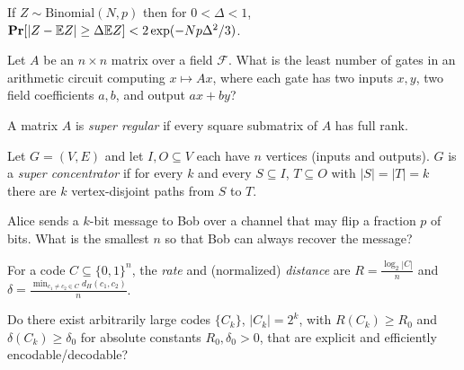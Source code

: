 \begin{lemma}
  \label{lem:chernoff}
  \mathlibok
  If $Z\sim\mathrm{Binomial}(N,p)$ then for $0<\Delta<1$,
  $\mathbf{Pr}[|Z-\mathbb{E} Z|\ge\Delta\mathbb{E} Z]<2\exp(-Np\Delta^2/3)$.
\end{lemma}


\begin{problem}
  \label{prob:linear-transform}
  Let $A$ be an $n\times n$ matrix over a field $\mathcal F$. What is the least
  number of gates in an arithmetic circuit computing $x\mapsto Ax$, where each
  gate has two inputs $x,y$, two field coefficients $a,b$, and output $ax+by$?
\end{problem}

\begin{definition}
  \label{def:super-regular}
  A matrix $A$ is \emph{super regular} if every square submatrix of $A$ has full
  rank.
\end{definition}

\begin{definition}
  \label{def:super-concentrator}
  Let $G=(V,E)$ and let $I,O\subseteq V$ each have $n$ vertices (inputs and
  outputs). $G$ is a \emph{super concentrator} if for every $k$ and every
  $S\subseteq I$, $T\subseteq O$ with $|S|=|T|=k$ there are $k$ vertex-disjoint
  paths from $S$ to $T$.
\end{definition}

\begin{problem}
  \label{prob:noisy-channel}
  Alice sends a $k$-bit message to Bob over a channel that may flip a fraction
  $p$ of bits. What is the smallest $n$ so that Bob can always recover the
  message?
\end{problem}

\begin{definition}
  \label{def:code-rate-distance}
  For a code $C\subseteq\{0,1\}^n$, the \emph{rate} and (normalized)
  \emph{distance} are $R=\frac{\log_2|C|}{n}$ and
  $\delta=\frac{\min_{c_1\neq c_2\in C}d_H(c_1,c_2)}{n}$.
\end{definition}

\begin{problem}
  \label{prob:refined-codes}
  Do there exist arbitrarily large codes $\{C_k\}$, $|C_k|=2^k$, with
  $R(C_k)\ge R_0$ and $\delta(C_k)\ge\delta_0$ for absolute constants
  $R_0,\delta_0>0$, that are explicit and efficiently encodable/decodable?
\end{problem}

